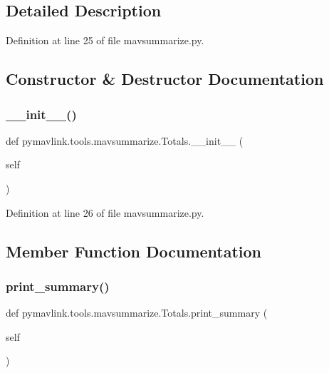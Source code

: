 \subsection{Detailed Description}


Definition at line 25 of file mavsummarize.\+py.



\subsection{Constructor \& Destructor Documentation}
\mbox{\label{classpymavlink_1_1tools_1_1mavsummarize_1_1Totals_ae1e7634a5a5773d76f27b18ab18c3ed7}} 
\subsubsection{\texorpdfstring{\_\_init\_\_()}{\_\_init\_\_()}}
{\footnotesize\ttfamily def pymavlink.\+tools.\+mavsummarize.\+Totals.\+\_\+\+\_\+init\+\_\+\+\_\+ (\begin{DoxyParamCaption}\item[{}]{self }\end{DoxyParamCaption})}



Definition at line 26 of file mavsummarize.\+py.



\subsection{Member Function Documentation}
\mbox{\label{classpymavlink_1_1tools_1_1mavsummarize_1_1Totals_a9eeac7c9507bd37d9ec74306996952ab}} 
\subsubsection{\texorpdfstring{print\_summary()}{print\_summary()}}
{\footnotesize\ttfamily def pymavlink.\+tools.\+mavsummarize.\+Totals.\+print\+\_\+summary (\begin{DoxyParamCaption}\item[{}]{self }\end{DoxyParamCaption})}



